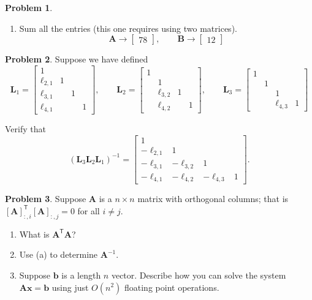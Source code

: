 \documentclass[12pt]{article}
\theoremstyle{definition}
\newtheorem{problem}{Problem}
\renewcommand{\vec}{\mathbf}
\newcommand{\T}{\mathsf{T}}
\begin{document}
\begin{problem}
\begin{enumerate}
    \item Sum all the entries (this one requires using two matrices).
    \[
        \vec{A} \to  
        \begin{bmatrix}
            78
        \end{bmatrix}
        ,\qquad 
        \vec{B} \to 
        \begin{bmatrix}
            12
        \end{bmatrix}
    \]

    \end{enumerate}
\end{problem}

\clearpage
\begin{problem}
    Suppose we have defined
    \[
\vec{L}_1=
\begin{bmatrix}
1 &\\
\ell_{2,1} &1 \\
\ell_{3,1} &&1 \\
\ell_{4,1} &&&1
\end{bmatrix}
,\qquad
\vec{L}_2=
\begin{bmatrix}
1 &\\
&1 \\
&\ell_{3,2} &1 \\
&\ell_{4,2}&&1
\end{bmatrix}
,\qquad
\vec{L}_3=
\begin{bmatrix}
1 &\\
&1 \\
&&1 \\
&&\ell_{4,3}&1
\end{bmatrix}
    \]

Verify that
    \[
(\vec{L}_3\vec{L}_2\vec{L}_1)^{-1}
=
\begin{bmatrix}
1 &\\
-\ell_{2,1} &1 \\
-\ell_{3,1} &-\ell_{3,2}&1 \\
-\ell_{4,1} &-\ell_{4,2}&-\ell_{4,3}&1
\end{bmatrix}.
\]
\end{problem}

\begin{problem}
    Suppose $\vec{A}$ is a $n\times n$ matrix with orthogonal columns; that is $[\vec{A}]_{:,i}^\T [\vec{A}]_{:,j} = 0$ for all $i\neq j$.
    \begin{enumerate}
        \item What is $\vec{A}^\T \vec{A}$?
        \item Use (a) to determine $\vec{A}^{-1}$.
        \item Suppose $\vec{b}$ is a length $n$ vector. Describe how you can solve the system $\vec{A}\vec{x} =\vec{b}$ using just $O(n^2)$ floating point operations.
    \end{enumerate}
\end{problem}
\end{document}
